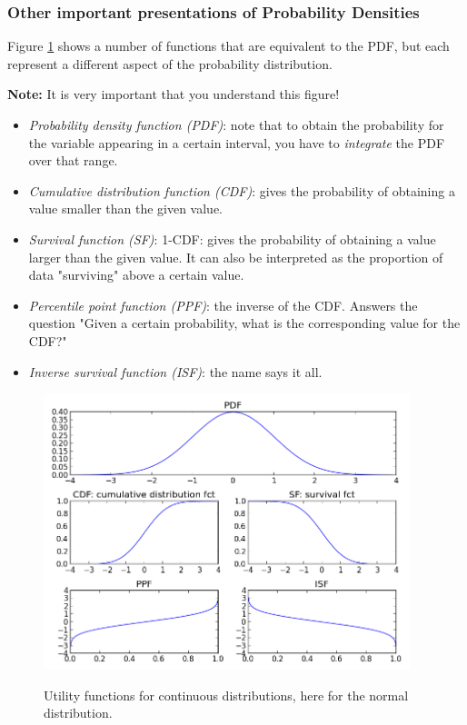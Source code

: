 \subsubsection{Other important presentations of Probability Densities}

Figure \ref{fig:DistributionUtilities} shows a number of functions that are equivalent to the PDF, but each represent a different aspect of the probability distribution.

\textbf{Note: }It is very important that you understand this figure!

\begin{itemize}
  \item \emph{Probability density function (PDF)}: note that to obtain the probability for the variable appearing in a certain interval, you have to \emph{integrate} the PDF over that range.
  \item \emph{Cumulative distribution function (CDF)}: gives the probability of obtaining a value smaller than the given value.
  \item \emph{Survival function (SF)}: 1-CDF: gives the probability of obtaining a value larger than the given value. It can also be interpreted as the proportion of data "surviving" above a certain value.
  \item \emph{Percentile point function (PPF)}: the inverse of the CDF. Answers the question "Given a certain probability, what is the corresponding value for the CDF?"
  \item \emph{Inverse survival function (ISF)}: the name says it all.
\end{itemize}

\begin{figure}
  \centering
  \includegraphics[width=0.95\textwidth]{../Images/DistributionFunctions.png}\\
  \caption{Utility functions for continuous distributions, here for the normal distribution.}\label{fig:DistributionUtilities}
\end{figure}

